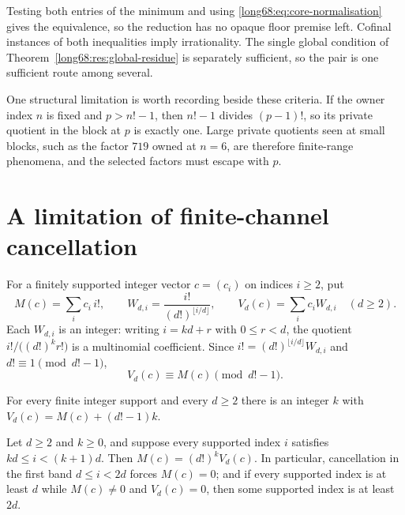 \documentclass[11pt]{article}
\newcommand{\chn}[2]{V_{#1}(#2)}
\begin{document}
Testing both entries of the minimum and using
\eqref{long68:eq:core-normalisation} gives the equivalence, so the reduction has no
opaque floor premise left.  Cofinal instances of both inequalities imply
irrationality.  The single global condition of
Theorem~\ref{long68:res:global-residue} is separately sufficient, so the pair is one
sufficient route among several.

\label{long68:res:split-factor-normalized-collision}
\label{long68:bdry:fixed-owner-absorption}
One structural limitation is worth recording beside these criteria.  If the
owner index $n$ is fixed and $p>n!-1$, then $n!-1$ divides $(p-1)!$, so its
private quotient in the block at $p$ is exactly one.  Large private quotients
seen at small blocks, such as the factor $719$ owned at $n=6$, are therefore
finite-range phenomena, and the selected factors must escape with $p$.

\section{A limitation of finite-channel cancellation}\label{long68:sec:channels}

For a finitely supported integer vector $c=(c_i)$ on indices $i\ge2$, put
\[
 M(c)=\sum_i c_i\,i!,\qquad
 W_{d,i}=\frac{i!}{(d!)^{\lfloor i/d\rfloor}},\qquad
 \chn dc=\sum_i c_iW_{d,i}\quad(d\ge2).
\]
Each $W_{d,i}$ is an integer: writing $i=kd+r$ with $0\le r<d$, the quotient
$i!/\bigl((d!)^kr!\bigr)$ is a multinomial coefficient.  Since
$i!=(d!)^{\lfloor i/d\rfloor}W_{d,i}$ and $d!\equiv1\pmod{d!-1}$,
\begin{equation}\label{long68:eq:channel-congruence}
 \chn dc\equiv M(c)\pmod{d!-1}.
\end{equation}

\begin{theorem}\label{long68:res:normalform}
For every finite integer support and every $d\ge2$ there is an integer $k$
with $\chn dc=M(c)+(d!-1)k$.
\end{theorem}

\begin{theorem}\label{long68:res:bandbreakpoint}
Let $d\ge2$ and $k\ge0$, and suppose every supported index $i$ satisfies
$kd\le i<(k+1)d$.  Then $M(c)=(d!)^k\chn dc$.  In particular, cancellation
in the first band $d\le i<2d$ forces $M(c)=0$; and if every supported index
is at least $d$ while $M(c)\ne0$ and $\chn dc=0$, then some supported index
is at least $2d$.
\end{theorem}
\end{document}
